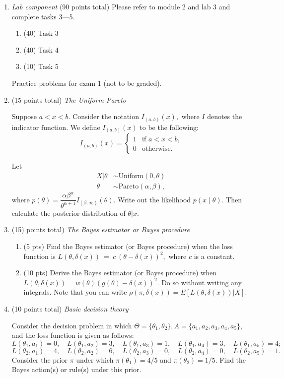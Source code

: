 \documentclass{article}
\begin{document}
\begin{enumerate}
\item {\em Lab component} 
  (90 points total) Please refer to module 2 and lab 3 and complete tasks 3---5. 
  \begin{enumerate}
  \item (40) Task 3
  \item (40) Task 4
  \item (10) Task 5
  \end{enumerate}
  
  \newpage
  
Practice problems for exam 1 (not to be graded).   
  
\item (15 points total) {\em The Uniform-Pareto}

Suppose $a < x < b.$ Consider the notation
$I_{(a,b)}(x),$ where $I$ denotes the indicator function. We define $I_{(a,b)}(x)$ to be the following:
$$
I_{(a,b)}(x)=
\begin{cases} 
1 & \text{if $a < x < b$,}
\\
0 &\text{otherwise.}
\end{cases}
$$

Let 
\begin{align*}
X|\theta &\sim \text{Uniform}(0,\theta)\\
\theta &\sim \text{Pareto}(\alpha,\beta),
\end{align*}
where $p(\theta) = \dfrac{\alpha \beta^\alpha}{\theta^{\alpha +1}}I_{(\beta,\infty)}(\theta).$
Write out the likelihood $p(x\mid \theta).$ Then calculate the posterior distribution of $\theta|x.$  
  
  
\item (15)  points total) {\em The Bayes estimator or Bayes procedure}
\begin{enumerate}
\item (5 pts) Find the Bayes estimator (or Bayes procedure) when the loss function is  $L(\theta, \delta(x))~=~c~(\theta-\delta(x))^2,$ where $c$ is a constant. 
\item (10 pts) Derive the Bayes estimator (or Bayes procedure) when $L(\theta, \delta(x)) = w(\theta) (g(\theta)-\delta(x))^2.$ Do so without writing any integrals. Note that you can write $\rho(\pi,\delta(x)) =  E[L(\theta,\delta(x))|X].$ 
\end{enumerate}

\item  (10 points total) {\em Basic decision theory}

Consider the decision problem in which $\Theta = \{ \theta_1, \theta_2\}, 
A = \{a_1, a_2, a_3, a_4, a_5\}$, and the loss function is given as follows: 
$$L(\theta_1, a_1) = 0,\quad L(\theta_1, a_2) = 3,\quad L(\theta_1, a_3) = 1,\quad L(\theta_1, a_4) = 3,\quad
L(\theta_1, a_5) = 4;$$ 
$$L(\theta_2, a_1) = 4,\quad L(\theta_2, a_2) = 6,\quad L(\theta_2, a_3) = 0,\quad L(\theta_2, a_4) = 0,\quad
L(\theta_2, a_5) = 1.$$
Consider the prior $\pi$ under which $\pi(\theta_1) = 4/5$ and $\pi(\theta_2) = 1/5.$ Find the Bayes action(s) or rule(s) under this prior. 


    \end{enumerate}
\end{document}
